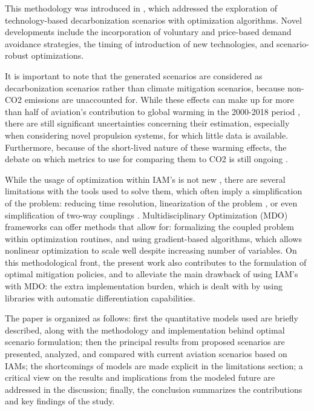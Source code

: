 \documentclass[a4paper,fleqn]{cas-dc}
\begin{document}
This methodology was introduced in \cite{costaalves-isabe}, which addressed the exploration of technology-based decarbonization scenarios with optimization algorithms. Novel developments include the incorporation of voluntary and price-based demand avoidance strategies, the timing of introduction of new technologies, and scenario-robust optimizations.

It is important to note that the generated scenarios are considered as decarbonization scenarios rather than climate mitigation scenarios, because non-CO2 emissions are unaccounted for. While these effects can make up for more than half of aviation's contribution to global warming in the 2000-2018 period \cite{lee_contribution_2021}, there are still significant uncertainties concerning their estimation, especially when considering novel propulsion systems, for which little data is available. Furthermore, because of the short-lived nature of these warming effects, the debate on which metrics to use for comparing them to CO2 is still ongoing \cite{megill_alternative_2024}.

While the usage of optimization within IAM's is not new \cite{nordhaus_optimal_1992, barrage_policies_2023, gcam-2019, witness}, there are several limitations with the tools used to solve them, which often imply a simplification of the problem: reducing time resolution, linearization of the problem \cite{huppmann_messageix_2019}, or even simplification of two-way couplings \cite{jgcricassandra_2024}. Multidisciplinary Optimization (MDO) frameworks can offer methods that allow for: formalizing the coupled problem within optimization routines, and using gradient-based algorithms, which allows nonlinear optimization to scale well despite increasing number of variables. On this methodological front, the present work also contributes to the formulation of optimal mitigation policies, and to alleviate the main drawback of using IAM's with MDO: the extra implementation burden, which is dealt with by using libraries with automatic differentiation capabilities.

The paper is organized as follows: first the quantitative models used are briefly described, along with the methodology and implementation behind optimal scenario formulation; then the principal results from proposed scenarios are presented, analyzed, and compared with current aviation scenarios based on IAMs; the shortcomings of models are made explicit in the limitations section; a critical view on the results and implications from the modeled future are addressed in the discussion; finally, the conclusion summarizes the contributions and key findings of the study.
\end{document}
